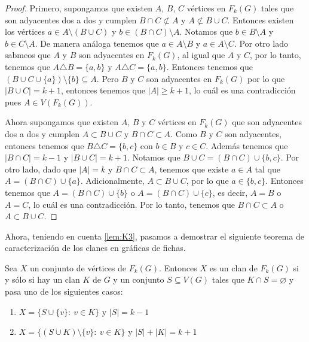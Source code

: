 \begin{proof}
    Primero, supongamos que existen $A$, $B$, $C$ v\'ertices en $F_k(G)$ tales
    que son adyacentes dos a dos y cumplen $B \cap C \not\subset A$ y $A
    \not\subset B \cup C$. Entonces existen los v\'ertices  $a \in A \setminus
    (B \cup C)$ y $b \in (B \cap C)\setminus A$. Notamos que $b \in B \setminus
    A$ y $b \in C \setminus A$. De manera an\'aloga tenemos que $a \in A
    \setminus B$ y $a \in A \setminus C$. Por otro lado sabmeos que $A$ y $B$
    son adyacentes en $F_k(G)$, al igual que $A$ y $C$, por lo tanto, tenemos que
    $A \triangle B = \{a,b\}$ y $A \triangle C = \{a, b\}$. Entonces tenemos que
    $(B \cup C \cup \{a\})\setminus \{b\} \subseteq A$. Pero $B$ y $C$ son
    adyacentes en $F_k(G)$ por lo que $|B \cup C| = k+1$, entonces tenemos que
    $|A| \geq k+1$, lo cu\'al es una contradicci\'on pues $A \in V (F_k(G))$. 

    Ahora supongamos que existen $A$, $B$ y $C$ v\'ertices en $F_k(G)$ que son
    adyacentes dos a dos y cumplen $A \subset B \cup C$ y $B \cap C \subset A$.
    Como $B$ y $C$ son adyacentes, entonces tenemos que $B \triangle C =
    \{b,c\}$ con $b \in B$ y $c \in C$. Adem\'as tenemos que $|B \cap C| = k-1$
    y $|B \cup C| = k +1$. Notamos que $B \cup C = (B\cap C) \cup \{b,c\}$. Por
    otro lado, dado que $|A|=k$ y $B \cap C \subset A$, tenemos que existe $a
    \in A$ tal que $A = (B \cap C) \cup \{a\}$. Adicionalmente, $A \subset B
    \cup C$, por lo que $a \in \{b, c\}$. Entonces tenemos que $A = (B \cap C)
    \cup \{b\}$ o $A = (B \cap C) \cup \{c\}$, es decir, $A = B$ o $A=C$, lo
    cu\'al es una contradicci\'on. Por lo tanto, tenemos que $B \cap C \subset A$
    o $A \subset B \cup C$.
\end{proof}

Ahora, teniendo en cuenta \cref{lem:K3}, pasamos a demostrar el siguiente
teorema de caracterizaci\'on de los clanes en gr\'aficas de fichas.

\begin{teorema}
\label{teo:clanG-clanFG}
    Sea $X$ un conjunto de v\'ertices de $F_k(G)$. Entonces $X$ es un clan de
    $F_k(G)$ si y s\'olo si hay un clan $K$ de $G$ y un conjunto $S \subseteq
    V(G)$ tales que $K \cap S = \varnothing$ y pasa uno de los siguientes casos:
        \begin{enumerate}
            \item $X = \{S \cup \{v\}\colon\ v \in K\}$ y $|S| = k-1$
            \item $X = \{(S\cup K) \setminus \{v\}\colon\ v \in K \}$ y $|S| +
            |K| = k+1$
        \end{enumerate}
\end{teorema}

